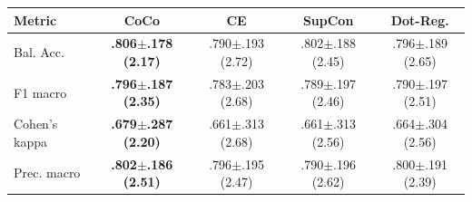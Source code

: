 \begin{tabular}{lcccc}
\toprule
Metric & CoCo & CE & SupCon & Dot-Reg. \\
\midrule
Bal. Acc. & \textbf{.806{\scriptsize$\pm$.178} (2.17)} & .790{\scriptsize$\pm$.193} (2.72) & .802{\scriptsize$\pm$.188} (2.45) & .796{\scriptsize$\pm$.189} (2.65) \\
F1 macro & \textbf{.796{\scriptsize$\pm$.187} (2.35)} & .783{\scriptsize$\pm$.203} (2.68) & .789{\scriptsize$\pm$.197} (2.46) & .790{\scriptsize$\pm$.197} (2.51) \\
Cohen's kappa & \textbf{.679{\scriptsize$\pm$.287} (2.20)} & .661{\scriptsize$\pm$.313} (2.68) & .661{\scriptsize$\pm$.313} (2.56) & .664{\scriptsize$\pm$.304} (2.56) \\
Prec. macro & \textbf{.802{\scriptsize$\pm$.186} (2.51)} & .796{\scriptsize$\pm$.195} (2.47) & .790{\scriptsize$\pm$.196} (2.62) & .800{\scriptsize$\pm$.191} (2.39) \\
\bottomrule
\end{tabular}
